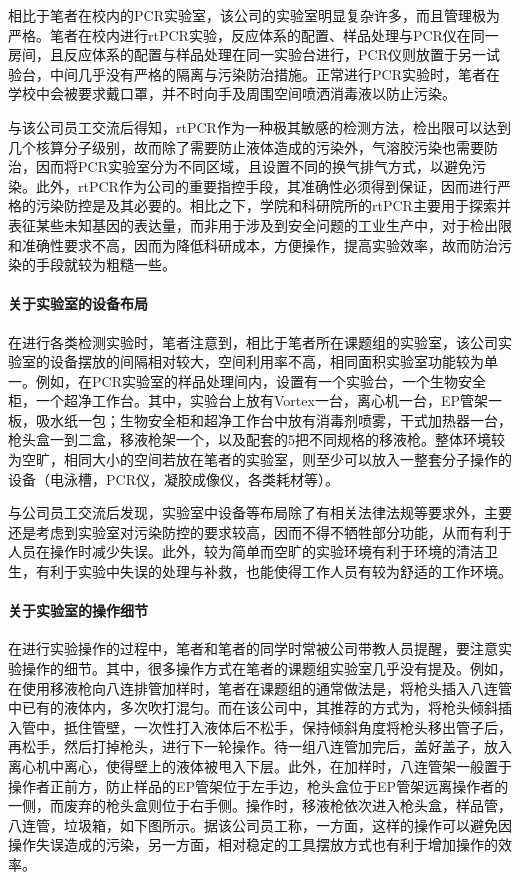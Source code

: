 \documentclass[cn,black,12pt,normal]{elegantnote}
\begin{document}
相比于笔者在校内的PCR实验室，该公司的实验室明显复杂许多，而且管理极为严格。笔者在校内进行rtPCR实验，反应体系的配置、样品处理与PCR仪在同一房间，且反应体系的配置与样品处理在同一实验台进行，PCR仪则放置于另一试验台，中间几乎没有严格的隔离与污染防治措施。正常进行PCR实验时，笔者在学校中会被要求戴口罩，并不时向手及周围空间喷洒消毒液以防止污染。

与该公司员工交流后得知，rtPCR作为一种极其敏感的检测方法，检出限可以达到几个核算分子级别，故而除了需要防止液体造成的污染外，气溶胶污染也需要防治，因而将PCR实验室分为不同区域，且设置不同的换气排气方式，以避免污染。此外，rtPCR作为公司的重要指控手段，其准确性必须得到保证，因而进行严格的污染防控是及其必要的。相比之下，学院和科研院所的rtPCR主要用于探索并表征某些未知基因的表达量，而非用于涉及到安全问题的工业生产中，对于检出限和准确性要求不高，因而为降低科研成本，方便操作，提高实验效率，故而防治污染的手段就较为粗糙一些。

\paragraph{关于实验室的设备布局} 在进行各类检测实验时，笔者注意到，相比于笔者所在课题组的实验室，该公司实验室的设备摆放的间隔相对较大，空间利用率不高，相同面积实验室功能较为单一。例如，在PCR实验室的样品处理间内，设置有一个实验台，一个生物安全柜，一个超净工作台。其中，实验台上放有Vortex一台，离心机一台，EP管架一板，吸水纸一包；生物安全柜和超净工作台中放有消毒剂喷雾，干式加热器一台，枪头盒一到二盒，移液枪架一个，以及配套的5把不同规格的移液枪。整体环境较为空旷，相同大小的空间若放在笔者的实验室，则至少可以放入一整套分子操作的设备（电泳槽，PCR仪，凝胶成像仪，各类耗材等）。

与公司员工交流后发现，实验室中设备等布局除了有相关法律法规等要求外，主要还是考虑到实验室对污染防控的要求较高，因而不得不牺牲部分功能，从而有利于人员在操作时减少失误。此外，较为简单而空旷的实验环境有利于环境的清洁卫生，有利于实验中失误的处理与补救，也能使得工作人员有较为舒适的工作环境。

\paragraph{关于实验室的操作细节} 在进行实验操作的过程中，笔者和笔者的同学时常被公司带教人员提醒，要注意实验操作的细节。其中，很多操作方式在笔者的课题组实验室几乎没有提及。例如，在使用移液枪向八连排管加样时，笔者在课题组的通常做法是，将枪头插入八连管中已有的液体内，多次吹打混匀。而在该公司中，其推荐的方式为，将枪头倾斜插入管中，抵住管壁，一次性打入液体后不松手，保持倾斜角度将枪头移出管子后，再松手，然后打掉枪头，进行下一轮操作。待一组八连管加完后，盖好盖子，放入离心机中离心，使得壁上的液体被甩入下层。此外，在加样时，八连管架一般置于操作者正前方，防止样品的EP管架位于左手边，枪头盒位于EP管架远离操作者的一侧，而废弃的枪头盒则位于右手侧。操作时，移液枪依次进入枪头盒，样品管，八连管，垃圾箱，如下图所示。据该公司员工称，一方面，这样的操作可以避免因操作失误造成的污染，另一方面，相对稳定的工具摆放方式也有利于增加操作的效率。
\end{document}
